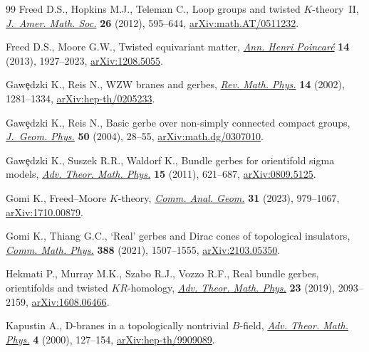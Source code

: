 \documentclass[10pt,a4paper]{amsart}
\numberwithin{equation}{section}
\begin{document}
\begin{thebibliography}{99}
Freed D.S., Hopkins M.J., Teleman C., Loop groups and twisted
 {$K$}-theory~{II},
 \href{https://doi.org/10.1090/s0894-0347-2013-00761-4}{\textit{J.~Amer. Math.
 Soc.}} \textbf{26} (2012), 595--644,
 \href{http://arxiv.org/abs/math.AT/0511232}{arXiv:math.AT/0511232}.

Freed D.S., Moore G.W., Twisted equivariant matter,
 \href{https://doi.org/10.1007/s00023-013-0236-x}{\textit{Ann. Henri
 Poincar\'e}} \textbf{14} (2013), 1927--2023,
 \href{http://arxiv.org/abs/1208.5055}{arXiv:1208.5055}.

Gaw\c{e}dzki K., Reis N., W{ZW} branes and gerbes,
 \href{https://doi.org/10.1142/S0129055X02001557}{\textit{Rev. Math. Phys.}}
 \textbf{14} (2002), 1281--1334,
 \href{http://arxiv.org/abs/hep-th/0205233}{arXiv:hep-th/0205233}.

Gaw\c{e}dzki K., Reis N., Basic gerbe over non-simply connected compact groups,
 \href{https://doi.org/10.1016/j.geomphys.2003.11.004}{\textit{J.~Geom.
 Phys.}} \textbf{50} (2004), 28--55,
 \href{http://arxiv.org/abs/math.dg/0307010}{arXiv:math.dg/0307010}.

Gaw\c{e}dzki K., Suszek R.R., Waldorf K., Bundle gerbes for orientifold sigma
 models, \href{https://doi.org/10.4310/atmp.2011.v15.n3.a1}{\textit{Adv.
 Theor. Math. Phys.}} \textbf{15} (2011), 621--687,
 \href{http://arxiv.org/abs/0809.5125}{arXiv:0809.5125}.

Gomi K., Freed--{M}oore {$K$}-theory,
 \href{https://doi.org/10.4310/cag.2023.v31.n4.a7}{\textit{Comm. Anal. Geom.}}
 \textbf{31} (2023), 979--1067,
 \href{http://arxiv.org/abs/1710.00879}{arXiv:1710.00879}.

Gomi K., Thiang G.C., `{R}eal' gerbes and {D}irac cones of topological
 insulators, \href{https://doi.org/10.1007/s00220-021-04238-0}{\textit{Comm.
 Math. Phys.}} \textbf{388} (2021), 1507--1555,
 \href{http://arxiv.org/abs/2103.05350}{arXiv:2103.05350}.

Hekmati P., Murray M.K., Szabo R.J., Vozzo R.F., Real bundle gerbes,
 orientifolds and twisted {$KR$}-homology,
 \href{https://doi.org/10.4310/atmp.2019.v23.n8.a5}{\textit{Adv. Theor. Math.
 Phys.}} \textbf{23} (2019), 2093--2159,
 \href{http://arxiv.org/abs/1608.06466}{arXiv:1608.06466}.

Kapustin A., D-branes in a topologically nontrivial {$B$}-field,
 \href{https://doi.org/10.4310/ATMP.2000.v4.n1.a3}{\textit{Adv. Theor. Math.
 Phys.}} \textbf{4} (2000), 127--154,
 \href{http://arxiv.org/abs/hep-th/9909089}{arXiv:hep-th/9909089}.


\end{thebibliography}
\end{document}
